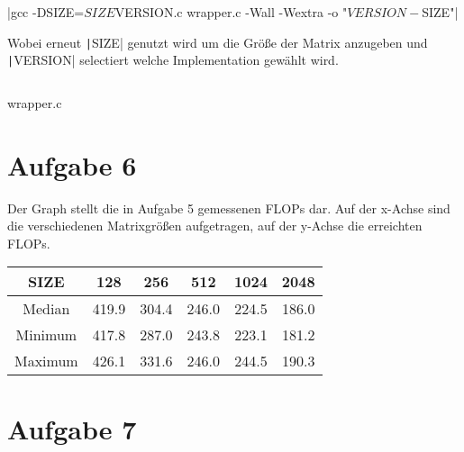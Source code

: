 \documentclass[a4paper]{article}
\begin{document}
|gcc -DSIZE=${SIZE} ${VERSION}.c wrapper.c -Wall -Wextra -o "${VERSION}-${SIZE}"|

Wobei erneut \texttt|SIZE| genutzt wird um die Größe der Matrix anzugeben und \texttt|VERSION| selectiert welche Implementation gewählt wird.

\begin{listing}
\inputminted[firstline=6, linenos=true]{c}{wrapper.c}
\caption{wrapper.c}
\label{lst:wrapper}
\end{listing}

\section*{Aufgabe 6}
Der Graph stellt die in Aufgabe 5 gemessenen FLOPs dar. Auf der x-Achse sind die verschiedenen Matrixgrößen aufgetragen, auf der y-Achse die erreichten FLOPs.

\begin{center}
\end{center}

\begin{table}[h!]
 \begin{tabular}{c|c c c c c}
 SIZE & 128 & 256 & 512 & 1024 & 2048 \\ [0.5ex] 
 \hline\hline
 Median& 419.9& 304.4& 246.0& 224.5& 186.0 \\ [1ex]
 Minimum& 417.8& 287.0& 243.8& 223.1& 181.2 \\ [1ex]
 Maximum& 426.1& 331.6& 246.0& 244.5& 190.3 \\ [1ex]
 \end{tabular}
\end{table}

\section*{Aufgabe 7}
\end{document}

